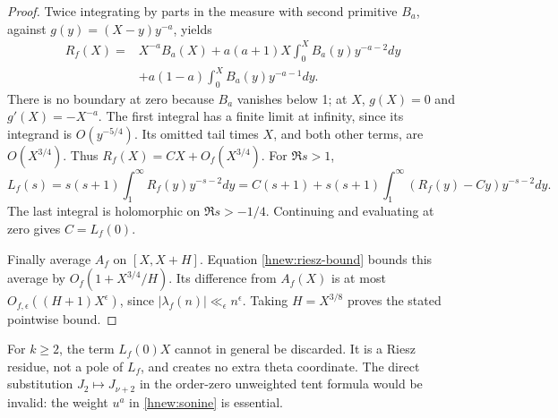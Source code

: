 \begin{proof}
Twice integrating by parts in the measure with second primitive
$B_a$, against $g(y)=(X-y)y^{-a}$, yields
\begin{equation}\label{hnew:abel-twice}
 \begin{split}
 R_f(X)={}&X^{-a}B_a(X)
  +a(a+1)X\int_0^X B_a(y)y^{-a-2}dy\\
 &+a(1-a)\int_0^X B_a(y)y^{-a-1}dy.
 \end{split}
\end{equation}
There is no boundary at zero because $B_a$ vanishes below 1;
at $X$, $g(X)=0$ and $g'(X)=-X^{-a}$.
The first integral has a finite limit at infinity, since its
integrand is $O(y^{-5/4})$.  Its omitted tail times $X$, and both
other terms, are $O(X^{3/4})$.  Thus
$R_f(X)=CX+O_f(X^{3/4})$.
For $\Re s>1$,
\[
 L_f(s)=s(s+1)\int_1^\infty R_f(y)y^{-s-2}dy
       =C(s+1)+s(s+1)\int_1^\infty(R_f(y)-Cy)y^{-s-2}dy.
\]
The last integral is holomorphic on $\Re s>-1/4$.
Continuing and evaluating at zero gives $C=L_f(0)$.

Finally average $A_f$ on $[X,X+H]$.
Equation \eqref{hnew:riesz-bound} bounds this average by
$O_f(1+X^{3/4}/H)$.  Its difference from $A_f(X)$ is at most
$O_{f,\epsilon}((H+1)X^\epsilon)$, since
$|\lambda_f(n)|\ll_\epsilon n^\epsilon$.
Taking $H=X^{3/8}$ proves the stated pointwise bound.
\end{proof}

For $k\ge2$, the term $L_f(0)X$ cannot in general be discarded.
It is a Riesz residue, not a pole of $L_f$, and creates no extra
theta coordinate.  The direct substitution $J_2\mapsto J_{\nu+2}$
in the order-zero unweighted tent formula would be invalid:
the weight $u^a$ in \eqref{hnew:sonine} is essential.

